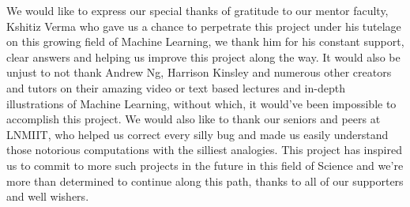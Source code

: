 We would like to express our special thanks of gratitude to our mentor faculty, Kshitiz Verma who gave us a chance to perpetrate this project under his tutelage on this growing field of Machine Learning, we thank him for his constant support, clear answers and helping us improve this project along the way.
It would also be unjust to not thank Andrew Ng, Harrison Kinsley and numerous other creators and tutors on their amazing video or text based lectures and in-depth illustrations of Machine Learning, without which, it would've been impossible to accomplish this project. 
We would also like to thank our seniors and peers at LNMIIT, who helped us correct every silly bug and made us easily understand those notorious computations with the silliest analogies.
This project has inspired us to commit to more such projects in the future in this field of Science and we're more than determined to continue along this path, thanks to all of our supporters and well wishers.